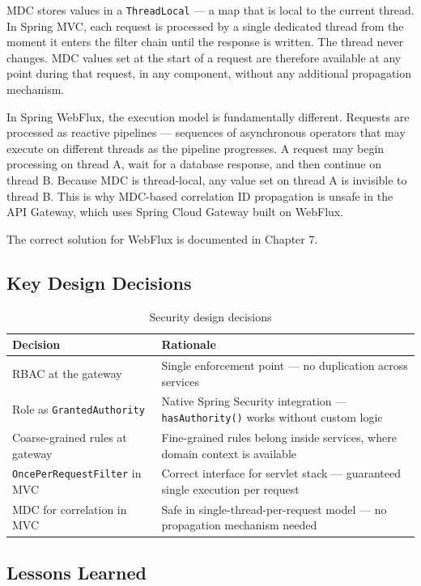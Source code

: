 MDC stores values in a \texttt{ThreadLocal} --- a map that is local to the current thread. In Spring MVC, each request is processed by a single dedicated thread from the moment it enters the filter chain until the response is written. The thread never changes. MDC values set at the start of a request are therefore available at any point during that request, in any component, without any additional propagation mechanism.

In Spring WebFlux, the execution model is fundamentally different. Requests are processed as reactive pipelines --- sequences of asynchronous operators that may execute on different threads as the pipeline progresses. A request may begin processing on thread A, wait for a database response, and then continue on thread B. Because MDC is thread-local, any value set on thread A is invisible to thread B. This is why MDC-based correlation ID propagation is unsafe in the API Gateway, which uses Spring Cloud Gateway built on WebFlux.

The correct solution for WebFlux is documented in Chapter 7.

\subsection{Key Design Decisions}

\begin{table}[H]
\centering
\begin{tabular}{lp{8cm}}
\toprule
\textbf{Decision} & \textbf{Rationale} \\
\midrule
RBAC at the gateway & Single enforcement point --- no duplication across services \\
Role as \texttt{GrantedAuthority} & Native Spring Security integration --- \texttt{hasAuthority()} works without custom logic \\
Coarse-grained rules at gateway & Fine-grained rules belong inside services, where domain context is available \\
\texttt{OncePerRequestFilter} in MVC & Correct interface for servlet stack --- guaranteed single execution per request \\
MDC for correlation in MVC & Safe in single-thread-per-request model --- no propagation mechanism needed \\
\bottomrule
\end{tabular}
\caption{Security design decisions}
\end{table}

\subsection{Lessons Learned}

